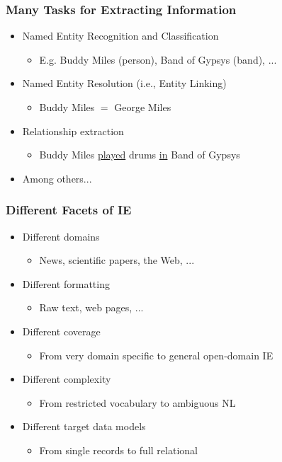 \documentclass{beamer}
\begin{document}
\begin{frame}
  \frametitle{Many Tasks for Extracting Information}
  \begin{itemize}
  \item Named Entity Recognition and Classification
      \begin{itemize}
      \item E.g. Buddy Miles (person), Band of Gypsys (band), ...
      \end{itemize}
  \item Named Entity Resolution (i.e., Entity Linking)
      \begin{itemize}
      \item Buddy Miles $=$ George Miles
      \end{itemize}
  \item Relationship extraction
      \begin{itemize}
      \item Buddy Miles \underline{played} drums \underline{in} Band of Gypsys
      \end{itemize}
  \item Among others...
  \end{itemize}
\end{frame}

\begin{frame}
  \frametitle{Different Facets of IE}
  \begin{itemize}
  \item Different domains
      \begin{itemize}
      \item News, scientific papers, the Web, ...
      \end{itemize}
  \item Different formatting
      \begin{itemize}
      \item Raw text, web pages, ...
      \end{itemize}
  \item Different coverage
      \begin{itemize}
      \item From very domain specific to general open-domain IE
      \end{itemize}
  \item Different complexity
      \begin{itemize}
      \item From restricted vocabulary to ambiguous NL
      \end{itemize}
  \item Different target data models
      \begin{itemize}
      \item From single records to full relational
      \end{itemize}
  \end{itemize}
\end{frame}
\end{document}
